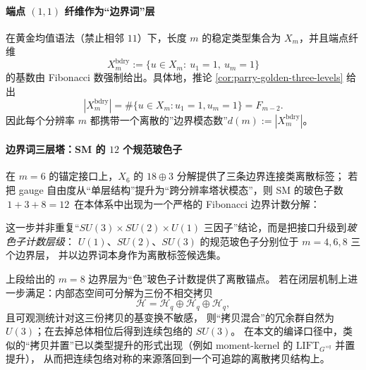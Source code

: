 \label{subsec:bdry-tower-zeck-gut-part1}
\paragraph{端点 \texorpdfstring{$(1,1)$}{(1,1)} 纤维作为“边界词”层}
在黄金均值语法（禁止相邻 \(11\)）下，长度 \(m\) 的稳定类型集合为 \(X_m\)，并且端点纤维
\[
X_m^{\mathrm{bdry}}
:=\{u\in X_m:\ u_1=1,\ u_m=1\}
\]
的基数由 Fibonacci 数强制给出。具体地，推论 \ref{cor:parry-golden-three-levels} 给出
\[
|X_m^{\mathrm{bdry}}|
=\#\{u\in X_m:u_1=1,u_m=1\}
=F_{m-2}.
\]
因此每个分辨率 \(m\) 都携带一个离散的”边界模态数”\(d(m):=|X_m^{\mathrm{bdry}}|\)。

\paragraph{边界词三层塔：SM 的 \(12\) 个规范玻色子}
在 \(m=6\) 的锚定接口上，\(X_6\) 的 \(18\oplus 3\) 分解提供了三条边界连接类离散标签；
若把 gauge 自由度从“单层结构”提升为“跨分辨率塔状模态”，则 SM 的玻色子数
\(\,1+3+8=12\,\)
在本体系中出现为一个严格的 Fibonacci 边界计数分解：

这一步并非重复“\(SU(3)\times SU(2)\times U(1)\) 三因子”结论，而是把接口升级到\emph{玻色子计数层级}：
\(U(1)\)、\(SU(2)\)、\(SU(3)\) 的规范玻色子分别位于 \(m=4,6,8\) 三个边界层，
并以边界词本身作为离散标签候选集。

\begin{remark}\label{rem:color-as-three-copy-envelope}
上段给出的 \(m=8\) 边界层为“色”玻色子计数提供了离散锚点。
若在闭层机制上进一步满足：内部态空间可分解为三份不相交拷贝
\[
\mathcal{H}=\mathcal{H}_q\oplus\mathcal{H}_q\oplus\mathcal{H}_q,
\]
且可观测统计对这三份拷贝的基变换不敏感，
则“拷贝混合”的冗余群自然为 \(U(3)\)；在去掉总体相位后得到连续包络的 \(SU(3)\)。
在本文的编译口径中，类似的“拷贝并置”已以类型提升的形式出现（例如 moment-kernel 的 \(\mathrm{LIFT}_{G^{\times q}}\) 并置提升），
从而把连续包络对称的来源落回到一个可追踪的离散拷贝结构上。
\end{remark}

